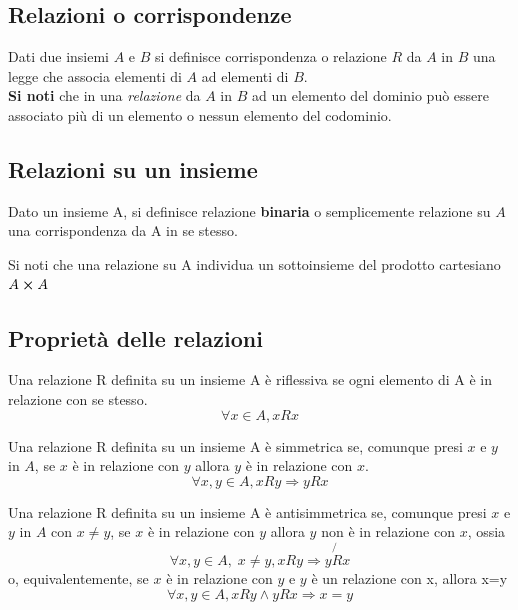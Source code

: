 \begin{flushleft}
\section{Relazioni o corrispondenze}
Dati due insiemi $A$ e $B$ si definisce corrispondenza o relazione $R$ da $A$ in $B$ una legge che associa elementi di $A$ ad elementi di $B$.\\
\textbf{Si noti} che in una \textit{relazione} da $A$ in $B$ ad un elemento del dominio può essere associato più di un elemento o nessun elemento del codominio. 

\subsection{Relazioni su un insieme}
\begin{definizione}
Dato un insieme A, si definisce relazione \textbf{binaria} o semplicemente relazione su $A$ una corrispondenza da A in se stesso.
\end{definizione}
Si noti che una relazione su A individua un sottoinsieme del prodotto cartesiano $A\cross A$

\subsection{Proprietà delle relazioni}
\begin{definizione}
Una relazione R definita su un insieme A è riflessiva se ogni elemento di A è in relazione con se stesso.
\[\forall x \in A, xRx\]
\end{definizione}

\begin{definizione}
Una relazione R definita su un insieme A è simmetrica se, comunque presi $x$ e $y$ in $A$, se $x$ è in relazione con $y$ allora $y$ è in relazione con $x$.
\[\forall x, y \in A, xRy\Rightarrow yRx\]
\end{definizione}


\begin{definizione}
Una relazione R definita su un insieme A
 è antisimmetrica se, comunque presi $x$ e $y$ in $A$ con $x\neq y$, se $x$ è in relazione con $y$ allora $y$ non è in relazione con $x$, ossia
 \[\forall x, y \in A,\;x\neq y, x Ry \Rightarrow y\not{R}x\]
 o, equivalentemente, se $x$ è in relazione con $y$ e $y$ è un relazione con x, allora x=y
\[\forall x, y \in A, xRy\land yRx \Rightarrow x=y\]
\end{definizione}


\end{flushleft}
